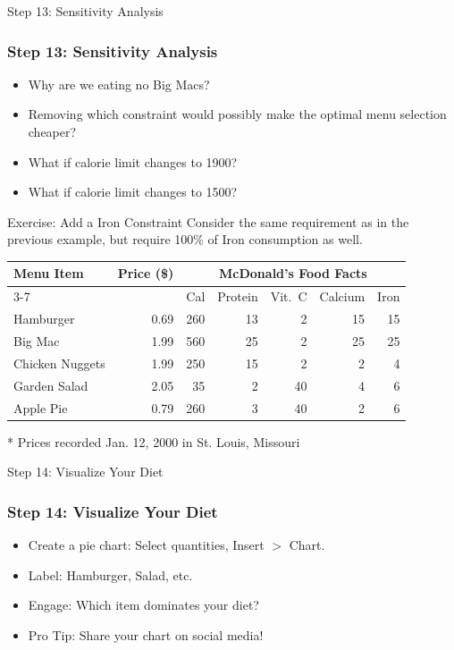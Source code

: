 \documentclass{beamer}
\begin{document}
\begin{frame}{Step 13: Sensitivity Analysis}
\frametitle{Step 13: Sensitivity Analysis}
\begin{itemize}[<+->]
  \item Why are we eating no Big Macs?
  \item Removing which constraint would possibly make the optimal menu selection cheaper?
  \item What if calorie limit changes to 1900?
  \item What if calorie limit changes to 1500?
\end{itemize}
\end{frame}

\begin{frame}[shrink]{Exercise: Add a Iron Constraint}
Consider the same requirement as in the previous example, but require 100\% of Iron consumption as well.
\vspace{-5pt}
\begin{table}
\footnotesize
\begin{tabular}{p{40pt}rrrrrr}
\toprule
\multirow{2}{*}{Menu Item} & \multirow{2}{*}{Price (\$)} & \multicolumn{5}{c}{McDonald's Food Facts}\\
\cmidrule{3-7}
 &  & Cal & Protein & Vit.~C & Calcium & Iron \\
\midrule
Hamburger & 0.69 & 260 & 13 & 2 & 15 & 15 \\\hline
Big Mac & 1.99 & 560 & 25 & 2 & 25 & 25 \\\hline
Chicken Nuggets & 1.99 & 250 & 15 & 2 & 2 & 4 \\\hline
Garden Salad & 2.05 & 35 & 2 & 40 & 4 & 6 \\\hline
Apple Pie & 0.79 & 260 & 3 & 40 & 2 & 6 \\
\bottomrule
\end{tabular}
\end{table}
\footnotesize{* Prices recorded Jan. 12, 2000 in St. Louis, Missouri}
\end{frame}

\begin{frame}{Step 14: Visualize Your Diet}
\frametitle{Step 14: Visualize Your Diet}
\begin{itemize}
  \item Create a pie chart: Select quantities, Insert \(>\) Chart.
  \item Label: Hamburger, Salad, etc.
  \item Engage: Which item dominates your diet?
  \item Pro Tip: Share your chart on social media!
\end{itemize}
\end{frame}
\end{document}
